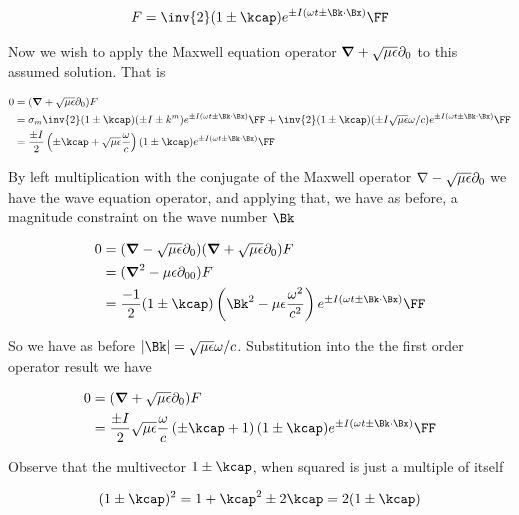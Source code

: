 \begin{align}\label{eqn:fooK}
F = \inv{2}(1 \pm \kcap) e^{\pm I(\omega t \pm \Bk \cdot \Bx)} \FF
\end{align}

Now we wish to apply the Maxwell equation operator $\boldsymbol{\nabla} + \sqrt{\mu\epsilon}\partial_0$ to this assumed solution.  That is

\begin{align*}
0 
&= (\spacegrad + \sqrt{\mu\epsilon}\partial_0) F \\
&= 
\sigma_m \inv{2}(1 \pm \kcap) (\pm I \pm k^m) e^{\pm I(\omega t \pm \Bk \cdot \Bx)} \FF
+ \inv{2}(1 \pm \kcap) (\pm I \sqrt{\mu\epsilon}\omega/c) e^{\pm I(\omega t \pm \Bk \cdot \Bx)} \FF \\
&= 
\frac{\pm I}{2}\left(\pm \kcap + \sqrt{\mu\epsilon}\frac{\omega}{c}\right)(1 \pm \kcap) e^{\pm I(\omega t \pm \Bk \cdot \Bx)} \FF
\end{align*}

By left multiplication with the conjugate of the Maxwell operator $\nabla - \sqrt{\mu\epsilon}\partial_0$ we have the wave equation operator, and applying that, we have as before, a magnitude constraint on the wave number $\Bk$ 

\begin{align*}
0 
&= (\spacegrad - \sqrt{\mu\epsilon}\partial_0) (\spacegrad + \sqrt{\mu\epsilon}\partial_0) F \\
&= (\spacegrad^2 - {\mu\epsilon}\partial_{00}) F \\
&= \frac{-1}{2}(1 \pm \kcap) \left( \Bk^2 - \mu\epsilon\frac{\omega^2}{c^2}\right) e^{\pm I(\omega t \pm \Bk \cdot \Bx)} \FF
\end{align*}

So we have as before $\Abs{\Bk} = \sqrt{\mu\epsilon}\omega/c$.  Substitution into the the first order operator result we have

\begin{align*}
0 
&= (\spacegrad + \sqrt{\mu\epsilon}\partial_0) F \\
&= 
\frac{\pm I}{2}\sqrt{\mu\epsilon}\frac{\omega}{c}\left(\pm \kcap + 1\right)(1 \pm \kcap) e^{\pm I(\omega t \pm \Bk \cdot \Bx)} \FF
\end{align*}

Observe that the multivector $1 \pm \kcap$, when squared is just a multiple of itself

\begin{align*}
(1 \pm \kcap)^2 = 1 + \kcap^2 \pm 2 \kcap = 2 (1 \pm \kcap)
\end{align*}

